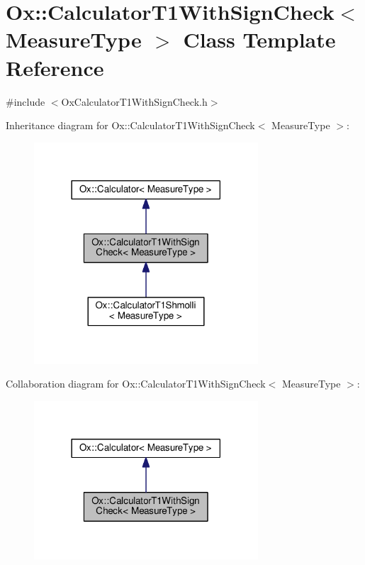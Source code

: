 \hypertarget{class_ox_1_1_calculator_t1_with_sign_check}{}\section{Ox\+:\+:Calculator\+T1\+With\+Sign\+Check$<$ Measure\+Type $>$ Class Template Reference}
\label{class_ox_1_1_calculator_t1_with_sign_check}


{\ttfamily \#include $<$Ox\+Calculator\+T1\+With\+Sign\+Check.\+h$>$}



Inheritance diagram for Ox\+:\+:Calculator\+T1\+With\+Sign\+Check$<$ Measure\+Type $>$\+:
\nopagebreak
\begin{figure}[H]
\begin{center}
\leavevmode
\includegraphics[width=237pt]{class_ox_1_1_calculator_t1_with_sign_check__inherit__graph}
\end{center}
\end{figure}


Collaboration diagram for Ox\+:\+:Calculator\+T1\+With\+Sign\+Check$<$ Measure\+Type $>$\+:
\nopagebreak
\begin{figure}[H]
\begin{center}
\leavevmode
\includegraphics[width=237pt]{class_ox_1_1_calculator_t1_with_sign_check__coll__graph}
\end{center}
\end{figure}
